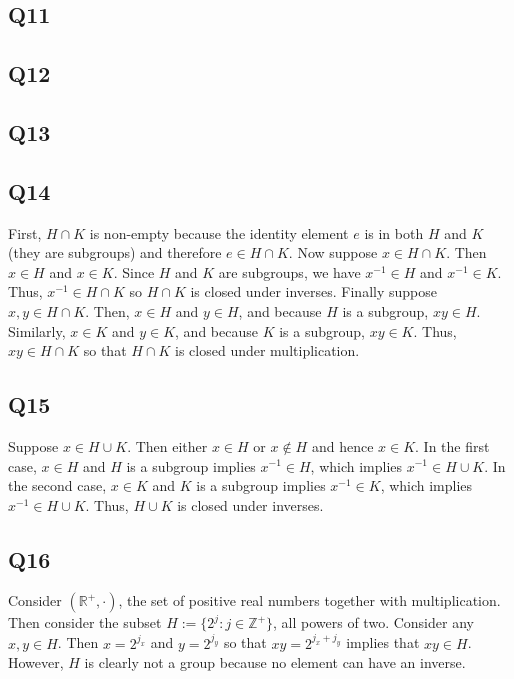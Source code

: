 \documentclass[12pt]{article}
\def\Z{{\mathbb Z}}        %
\def\R{{\mathbb R}}        %
\numberwithin{theorem}{section}
\numberwithin{equation}{section}
\numberwithin{remark}{section}
\numberwithin{definition}{section}
\numberwithin{theorem}{section}
\numberwithin{lemma}{section}
\numberwithin{example}{section}
\begin{document}
\subsection{Q11}

\subsection{Q12}

\subsection{Q13}

\subsection{Q14}

First, $H\cap K$ is non-empty because the identity element $e$ is in both $H$ and $K$ (they are subgroups) and therefore $e\in H\cap K$. Now suppose $x\in H\cap K$. Then $x\in H$ and $x\in K$. Since $H$ and $K$ are subgroups, we have $x^{-1}\in H$ and $x^{-1}\in K$. Thus, $x^{-1}\in H \cap K$ so $H\cap K$ is closed under inverses. Finally suppose $x,y\in H\cap K$. Then, $x\in H$ and $y\in H$, and because $H$ is a subgroup, $xy\in H$. Similarly, $x \in K$ and $y \in K$, and because $K$ is a subgroup, $xy\in K$. Thus, $xy\in H\cap K$ so that $H\cap K$ is closed under multiplication. 



\subsection{Q15}

Suppose $x\in H \cup K$. Then either $x\in H$ or $x\notin H$ and hence $x\in K$. In the first case, $x\in H$ and $H$ is a subgroup implies $x^{-1}\in H$, which implies $x^{-1}\in H\cup K$. In the second case, $x\in K$ and $K$ is a subgroup implies $x^{-1}\in K$, which implies $x^{-1}\in H\cup K$. Thus, $H\cup K$ is closed under inverses. 



\subsection{Q16}

Consider $(\R^+,\cdot)$, the set of positive real numbers together with multiplication. Then consider the subset $H:=\{2^j:j\in\Z^+\}$, all powers of two. Consider any $x,y\in H$. Then $x=2^{j_x}$ and $y=2^{j_y}$ so that $xy=2^{j_x+j_y}$ implies that $xy\in H$. However, $H$ is clearly not a group because no element can have an inverse. 
\end{document}
